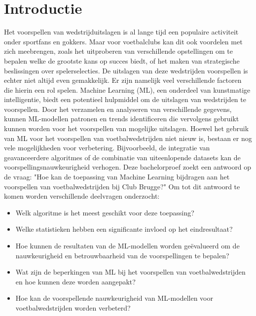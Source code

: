 
\section{Introductie}%
\label{sec:introductie}

Het voorspellen van wedstrijduitslagen is al lange tijd een populaire activiteit onder sportfans en gokkers. Maar voor voetbalclubs kan dit ook voordelen met zich meebrengen, zoals het uitproberen van verschillende opstellingen om te bepalen welke de grootste kans op succes biedt, of het maken van strategische beslissingen over spelerselecties. De uitslagen van deze wedstrijden voorspellen is echter niet altijd even gemakkelijk. Er zijn namelijk veel verschillende factoren die hierin een rol spelen.
Machine Learning (ML), een onderdeel van kunstmatige intelligentie, biedt een potentieel hulpmiddel om de uitslagen van wedstrijden te voorspellen. Door het verzamelen en analyseren van verschillende gegevens, kunnen ML-modellen patronen en trends identificeren die vervolgens gebruikt kunnen worden voor het voorspellen van mogelijke uitslagen.
Hoewel het gebruik van ML voor het voorspellen van voetbalwedstrijden niet nieuw is, bestaan er nog vele mogelijkheden voor verbetering. Bijvoorbeeld, de integratie van geavanceerdere algoritmes of de combinatie van uiteenlopende datasets kan de voorspellingsnauwkeurigheid verhogen. Deze bachelorproef zoekt een antwoord op de vraag: "Hoe kan de toepassing van Machine Learning bijdragen aan het voorspellen van voetbalwedstrijden bij Club Brugge?" Om tot dit antwoord te komen worden verschillende deelvragen onderzocht:

\begin{itemize}
  \item Welk algoritme is het meest geschikt voor deze toepassing?
  \item Welke statistieken hebben een significante invloed op het eindresultaat?
  \item Hoe kunnen de resultaten van de ML-modellen worden geëvalueerd om de nauwkeurigheid en betrouwbaarheid van de voorspellingen te bepalen?
  \item Wat zijn de beperkingen van ML bij het voorspellen van voetbalwedstrijden en hoe kunnen deze worden aangepakt?
  \item Hoe kan de voorspellende nauwkeurigheid van ML-modellen voor voetbalwedstrijden worden verbeterd?
\end{itemize}


